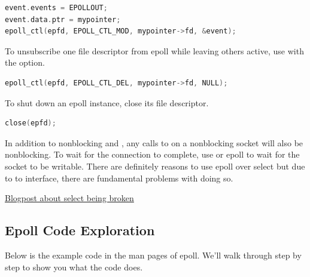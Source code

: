 \begin{lstlisting}[language=C]
event.events = EPOLLOUT;
event.data.ptr = mypointer;
epoll_ctl(epfd, EPOLL_CTL_MOD, mypointer->fd, &event);
\end{lstlisting}

To unsubscribe one file descriptor from epoll while leaving others active, use  with the  option.

\begin{lstlisting}[language=C]
epoll_ctl(epfd, EPOLL_CTL_DEL, mypointer->fd, NULL);
\end{lstlisting}

To shut down an epoll instance, close its file descriptor.

\begin{lstlisting}[language=C]
close(epfd);
\end{lstlisting}

In addition to nonblocking  and , any calls to  on a nonblocking socket will also be nonblocking.
To wait for the connection to complete, use  or epoll to wait for the socket to be writable.
There are definitely reasons to use epoll over select but due to to interface, there are fundamental problems with doing so.

\href{https://idea.popcount.org/2017-01-06-select-is-fundamentally-broken/}{Blogpost about select being broken}

\subsection{Epoll Code Exploration}

Below is the example code in the man pages of epoll. We'll walk through step by step to show you what the code does.

